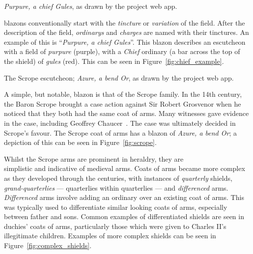 \documentclass[nobib, a4paper, twoside, justified]{tufte-book}
\makeatletter
\newcommand{\charges}{\glspl{charge}\@\xspace}
\newcommand{\blazon}{\gls{blazon}\@\xspace}
\newcommand{\ublazons}{\Glspl{blazon}\@\xspace}
\makeatother
\begin{document}
\begin{marginfigure}
  \centering
  \def\svgwidth{0.8\linewidth}
  
  \caption{\textit{Purpure, a chief Gules}, as drawn by the project web app.}%
  \label{fig:chief_example}
\end{marginfigure}

\ublazons conventionally start with the \textit{\gls{tincture}} or \textit{\gls{variation}} of the
field. After the description of the field, \textit{\glspl{ordinary}} and \textit{\charges} are
named with their tinctures. An example of this is ``\textit{Purpure, a chief Gules}''. This \blazon
describes an escutcheon with a field of \textit{purpure} (purple), with a \textit{Chief}
\gls{ordinary} (a bar across the top of the shield) of \textit{gules} (red). This can be seen
 in Figure~\ref{fig:chief_example}.

\begin{marginfigure}
  \centering
  \def\svgwidth{0.8\linewidth}
  
  \caption{The Scrope \gls{escutcheon}; \textit{Azure, a bend Or}, as drawn by the project web app.}%
  \label{fig:scrope}
\end{marginfigure}

A simple, but notable, \blazon is that of the Scrope family. In the 14th century, the Baron Scrope
brought a case action against Sir Robert Grosvenor when he noticed that they both had the same coat
of arms. Many witnesses gave evidence in the case, including Geoffrey
Chaucer~\autocite{scrope_grosvenor}. The case was ultimately decided in Scrope's favour. The Scrope
coat of arms has a \blazon of \textit{Azure, a bend Or}; a depiction of this can be seen in
Figure~\ref{fig:scrope}.

Whilst the Scrope arms are prominent in heraldry, they are \\ simplistic and indicative of
medieval arms. Coats of arms became more complex as they developed through the centuries, with
instances of \textit{quarterly} shields, \textit{grand-quarterlies} --- quarterlies within
quarterlies --- and \textit{differenced} arms. \textit{Differenced} arms involve adding an
\gls{ordinary} over an existing coat of arms. This was typically used to differentiate similar
looking coats of arms, especially between father and sons. Common examples of differentiated
shields are seen in duchies' coats of arms, particularly those which were given to Charles II's
illegitimate children. Examples of more complex shields can be seen in
Figure~\ref{fig:complex_shields}.
\end{document}

